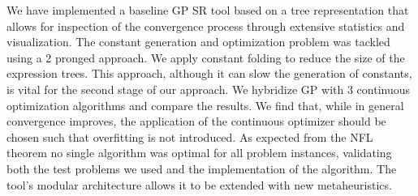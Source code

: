 We have implemented a baseline GP SR tool based on a tree representation that allows for inspection of the convergence process through extensive statistics and visualization. The constant generation and optimization problem was tackled using a 2 pronged approach. We apply constant folding to reduce the size of the expression trees. This approach, although it can slow the generation of constants, is vital for the second stage of our approach. We hybridize GP with 3 continuous optimization algorithms and compare the results. We find that, while in general convergence improves, the application of the continuous optimizer should be chosen such that overfitting is not introduced. As expected from the NFL theorem no single algorithm was optimal for all problem instances, validating both the test problems we used and the implementation of the algorithm. The tool's modular architecture allows it to be extended with new metaheuristics. 